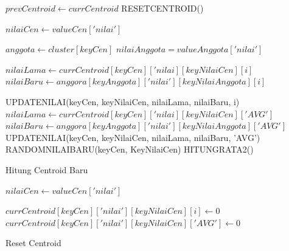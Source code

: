\begin{algorithm}[H]
  \begin{algorithmic}[1]
        \State $prevCentroid \gets currCentroid$
        \State RESETCENTROID()
        
            \State $nilaiCen \gets valueCen['nilai']$
            
                \State $anggota \gets cluster[keyCen]$
                        \State $nilaiAnggota = valueAnggota['nilai']$
                        
                                    \State $nilaiLama \gets currCentroid[keyCen]['nilai][keyNilaiCen][i]$
                                    \State $nilaiBaru \gets anggora[keyAnggota]['nilai'][keyNilaiAnggota][i]$
                                    
                                    \State UPDATENILAI(keyCen, keyNilaiCen, nilaiLama, nilaiBaru, i)
                                \EndFor
                                \State $nilaiLama \gets currCentroid[keyCen]['nilai][keyNilaiCen]['AVG']$
                                \State $nilaiBaru \gets anggora[keyAnggota]['nilai'][keyNilaiAnggota]['AVG']$
                                \State UPDATENILAI(keyCen, keyNilaiCen, nilaiLama, nilaiBaru, 'AVG')
                            \EndIf
                        \EndFor
                    \EndFor
                    \Else
                        \State RANDOMNILAIBARU(keyCen, KeyNilaiCen)
                \EndIf
            \EndFor
        \EndFor
        \State HITUNGRATA2()
    \EndProcedure
  \end{algorithmic} 
  \caption{Hitung Centroid Baru}
  \label{alg:hitungCentroidBaru}
\end{algorithm}

\begin{algorithm}[H]
  \begin{algorithmic}[1]
            \State $nilaiCen \gets valueCen['nilai']$
            
                    \State $currCentroid[keyCen]['nilai'][keyNilaiCen][i] \gets 0$
                \EndFor
                \State $currCentroid[keyCen]['nilai'][keyNilaiCen]['AVG'] \gets 0$
            \EndFor
        \EndFor
    \EndProcedure
  \end{algorithmic} 
  \caption{Reset Centroid}
  \label{alg:resetCentroid}
\end{algorithm}

